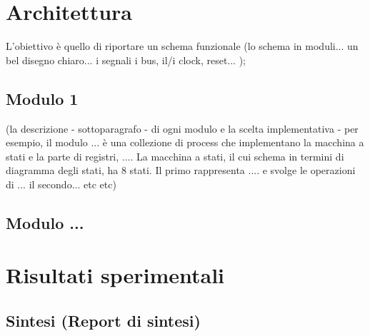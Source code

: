 \documentclass[paper=a4, fontsize=11pt]{scrartcl}
\numberwithin{equation}{section}		%
\numberwithin{figure}{section}			%
\numberwithin{table}{section}				%
\begin{document}
    \section{Architettura}
    \label{sec:arch}
        L’obiettivo è quello di riportare un schema funzionale (lo schema in moduli... un bel disegno chiaro... i segnali i bus, il/i clock, reset... );
    \subsection{Modulo 1}
    \label{subsec:mod1}
    (la descrizione - sottoparagrafo - di ogni modulo e la scelta
    implementativa - per esempio, il modulo ... è una collezione di process che
    implementano la macchina a stati e la parte di registri, .... La macchina a stati,
    il cui schema in termini di diagramma degli stati, ha 8 stati. Il primo
    rappresenta .... e svolge le operazioni di ... il secondo... etc etc)
    \subsection{Modulo ...}
    \label{subsec:mod}

    \section{Risultati sperimentali}
    \label{sec:result}
    \subsection{Sintesi (Report di sintesi)}
    \label{subsec:report}
\end{document}

